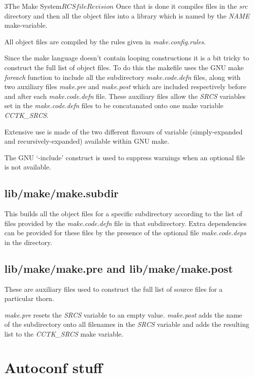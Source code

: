 \begin{cactuspart}{3}{The Make System}{$RCSfile$}{$Revision$}
Once that is done it compiles files in the {\em src} directory and then all
the object files into a library which is named by the {\em NAME} make-variable.

All object files are compiled by the rules given in {\em make.config.rules}.

Since the make language doesn't contain looping constructions it is a bit tricky
to construct the full list of object files.  To do this the makefile uses
the GNU make {\em foreach} function to include all the subdirectory 
{\em make.code.defn} files, along with two auxiliary files {\em make.pre} and
{\em make.post} which are included respectively before and after each 
{\em make.code.defn} file.  These auxiliary files allow the {\em SRCS} variables set in
the {\em make.code.defn} files to be concatanated onto one make variable 
{\em CCTK\_SRCS}.

Extensive use is made of the two different flavours of variable (simply-expanded and 
recursively-expanded) available within GNU make.

The GNU `-include' construct is used to suppress warnings when an optional file is
not available.

\section{lib/make/make.subdir}
\label{sec:makefiles:subdir}

This builds all the object files for a specific subdirectory according
to the list of files provided by the {\em make.code.defn} file
in that subdirectory.  Extra dependencies can be provided for these 
files by the presence of the optional file {\em make.code.deps} in the
directory.

\section{lib/make/make.pre and lib/make/make.post}
\label{sec:makefiles:prepost}

These are auxiliary files used to construct the full list of source
files for a particular thorn.

{\em make.pre} resets the {\em SRCS} variable to an empty value.  
{\em make.post} adds the name of the subdirectory onto all filenames
in the {\em SRCS} variable and adds the resulting list to the 
{\em CCTK\_SRCS} make variable.

\chapter{Autoconf stuff}
\label{ch:autoconf}


\end{cactuspart}
